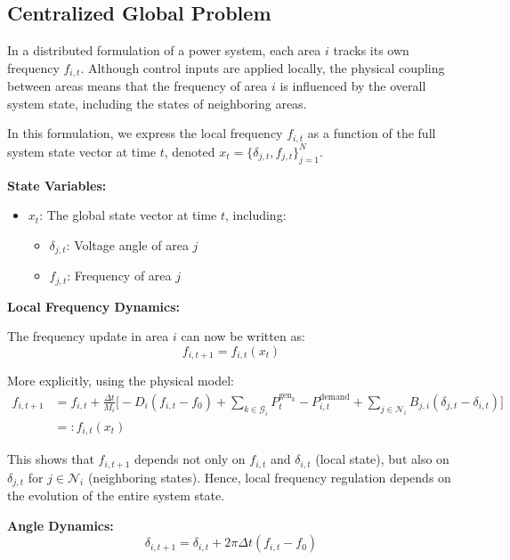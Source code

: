 \documentclass{article}
\begin{document}
\subsection{Centralized Global Problem}

In a distributed formulation of a power system, each area $i$ tracks its own frequency $f_{i,t}$. Although control inputs are applied locally, the physical coupling between areas means that the frequency of area $i$ is influenced by the overall system state, including the states of neighboring areas.

In this formulation, we express the local frequency $f_{i,t}$ as a function of the full system state vector at time $t$, denoted $x_t = \{ \delta_{j,t}, f_{j,t} \}_{j=1}^{N}$.

\textbf{State Variables:}
\begin{itemize}
    \item $x_t$: The global state vector at time $t$, including:
    \begin{itemize}
        \item $\delta_{j,t}$: Voltage angle of area $j$
        \item $f_{j,t}$: Frequency of area $j$
    \end{itemize}
\end{itemize}

\textbf{Local Frequency Dynamics:}

The frequency update in area $i$ can now be written as:
\begin{equation}
    f_{i,t+1} = f_{i,t}(x_t)
\end{equation}

More explicitly, using the physical model:
\begin{align}
    f_{i,t+1} &= f_{i,t} + \frac{\Delta t}{M_i} \Big[ -D_i(f_{i,t} - f_0) + \sum_{k \in \mathcal{G}_i} P^{\text{gen}_k}_t - P^{\text{demand}}_{i,t} + \sum_{j \in \mathcal{N}_i} B_{j,i}(\delta_{j,t} - \delta_{i,t}) \Big] \\
    &=: f_{i,t}(x_t)
\end{align}

This shows that $f_{i,t+1}$ depends not only on $f_{i,t}$ and $\delta_{i,t}$ (local state), but also on $\delta_{j,t}$ for $j \in \mathcal{N}_i$ (neighboring states). Hence, local frequency regulation depends on the evolution of the entire system state.

\textbf{Angle Dynamics:}
\begin{equation}
    \delta_{i,t+1} = \delta_{i,t} + 2\pi \Delta t (f_{i,t} - f_0)
\end{equation}
\end{document}
